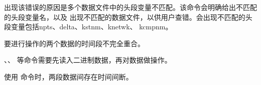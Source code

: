 出现该错误的原因是多个数据文件中的头段变量不匹配。该命令会明确给出不匹配的头段变量名，以及
出现不匹配的数据文件，以供用户查错。会出现不匹配的头段变量包括npts、delta、kstnm、knetwk、
kcmpnm。

要进行操作的两个数据的时间段不完全重合。

、、 等命令需要先读入二进制数据，再对数据做操作。

使用  命令时，两段数据间存在时间间断。